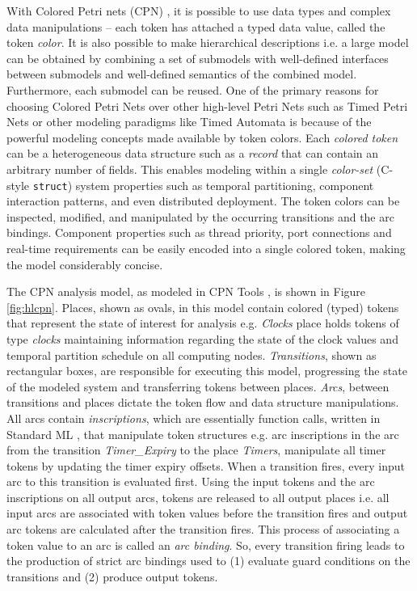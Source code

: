 With Colored Petri nets (CPN) \cite{CPN}, it is possible to use data types and complex data manipulations -- each token has attached a typed data value, called the token \emph{color}. It is also possible to make hierarchical descriptions i.e. a large model can be obtained by combining a set of submodels with well-defined interfaces between submodels and well-defined semantics of the combined model. Furthermore, each submodel can be reused. One of the primary reasons for choosing Colored Petri Nets over other high-level Petri Nets such as Timed Petri Nets or other modeling paradigms like Timed Automata is because of the powerful modeling concepts made available by token colors. Each \emph{colored token} can be a heterogeneous data structure such as a \emph{record} that can contain an arbitrary number of fields. This enables modeling within a single \emph{color-set} (C-style \texttt{struct}) system properties such as temporal partitioning, component interaction patterns, and even distributed deployment. The token colors can be inspected, modified, and manipulated by the occurring transitions and the arc bindings. Component properties such as thread priority, port connections and real-time requirements can be easily encoded into a single colored token, making the model considerably concise. 

The CPN analysis model, as modeled in CPN Tools \cite{CPNTools}, is shown in Figure \ref{fig:hlcpn}. Places, shown as ovals, in this model contain colored (typed) tokens that represent the state of interest for analysis e.g. \emph{Clocks} place holds tokens of type \emph{clocks} maintaining information regarding the state of the clock values and temporal partition schedule on all computing nodes. \emph{Transitions}, shown as rectangular boxes, are responsible for executing this model, progressing the state of the modeled system and transferring tokens between places. \emph{Arcs}, between transitions and places dictate the token flow and data structure manipulations. All arcs contain \emph{inscriptions}, which are essentially function calls, written in Standard ML \cite{milner1997definition}, that manipulate token structures e.g. arc inscriptions in the arc from the transition \emph{Timer\_Expiry} to the place \emph{Timers}, manipulate all timer tokens by updating the timer expiry offsets. When a transition fires, every input arc to this transition is evaluated first. Using the input tokens and the arc inscriptions on all output arcs, tokens are released to all output places i.e. all input arcs are associated with token values before the transition fires and output arc tokens are calculated after the transition fires. This process of associating a token value to an arc is called an \emph{arc binding}. So, every transition firing leads to the production of strict arc bindings used to (1) evaluate guard conditions on the transitions and (2) produce output tokens.

